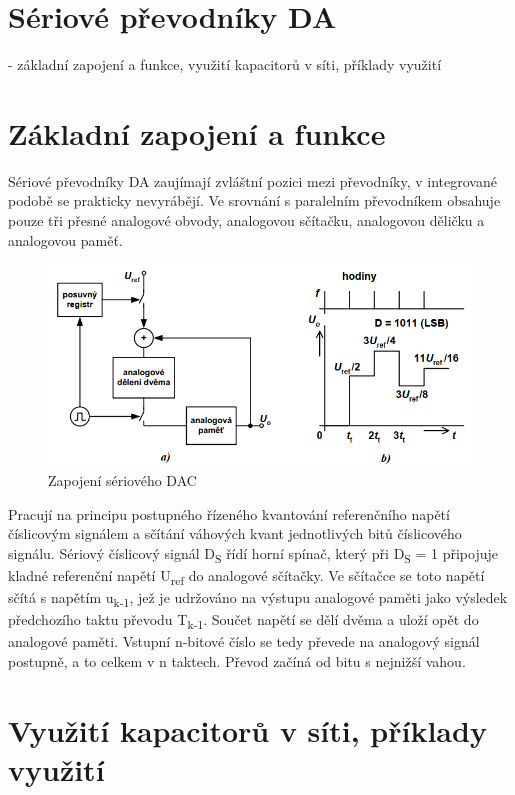 \section{Sériové převodníky DA}
- základní zapojení a funkce, využití kapacitorů v síti, příklady využití

\section{Základní zapojení a funkce}
Sériové převodníky DA zaujímají zvláštní pozici mezi převodníky, v integrované podobě se prakticky nevyrábějí. Ve srovnání s paralelním převodníkem obsahuje pouze tři přesné analogové obvody, analogovou sčítačku, analogovou děličku a analogovou paměť.
\begin{figure}[h]
   \begin{center}
     \includegraphics[scale=0.6]{images/DAser.png}
   \end{center}
   \caption{Zapojení sériového DAC}
\end{figure}

Pracují na principu postupného řízeného kvantování referenčního napětí číslicovým
signálem a sčítání váhových kvant jednotlivých bitů číslicového signálu. Sériový číslicový signál D\textsubscript{S} řídí horní spínač, který při D\textsubscript{S} = 1 připojuje kladné referenční napětí U\textsubscript{ref} do analogové sčítačky. Ve sčítačce se toto napětí sčítá s napětím u\textsubscript{k-1}, jež je udržováno na výstupu analogové paměti jako výsledek předchozího taktu převodu T\textsubscript{k-1}. Součet napětí se dělí dvěma a uloží opět do analogové paměti. Vstupní n-bitové číslo se tedy převede na analogový signál postupně, a to celkem v n taktech. Převod začíná od bitu s nejnižší vahou.

\section{Využití kapacitorů v síti, příklady využití}
